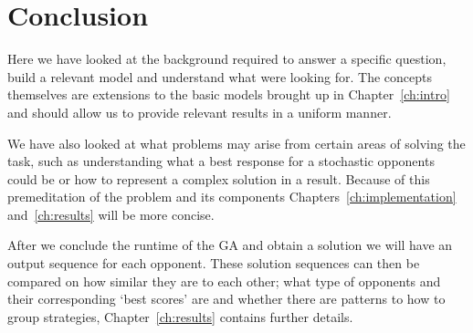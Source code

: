 \section{Conclusion}
Here we have looked at the background required to answer a specific question, build a relevant model and understand what were looking for.
The concepts themselves are extensions to the basic models brought up in Chapter~\ref{ch:intro} and should allow us to provide relevant results in a uniform manner.

We have also looked at what problems may arise from certain areas of solving the task, such as understanding what a best response for a stochastic opponents could be or how to represent a complex solution in a result.
Because of this premeditation of the problem and its components Chapters~\ref{ch:implementation} and~\ref{ch:results} will be more concise.

After we conclude the runtime of the GA and obtain a solution we will have an output sequence for each opponent.
These solution sequences can then be compared on how similar they are to each other;
what type of opponents and their corresponding `best scores' are and whether there are patterns to how to group strategies, Chapter~\ref{ch:results} contains further details.